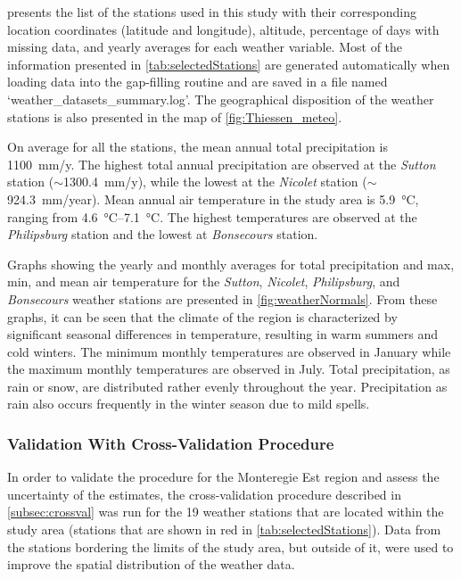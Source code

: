 \documentclass[TechnicalNoteMeteo.tex]{subfiles}
\begin{document}
 presents the list of the stations used in this study with their corresponding location coordinates (latitude and longitude), altitude, percentage of days with missing data, and yearly averages for each weather variable. Most of the information presented in \cref{tab:selectedStations} are generated automatically when loading data into the gap-filling routine and are saved in a file named `weather\_datasets\_summary.log'. The geographical disposition of the weather stations is also presented in the map of \cref{fig:Thiessen_meteo}.

On average for all the stations, the mean annual total precipitation is \SI{1100}{mm/y}. The highest total annual precipitation are observed at the \emph{Sutton} station ($\sim$\SI{1300.4}{mm/y}), while the lowest at the \emph{Nicolet} station ($\sim$\SI{924.3}{mm/year}). Mean annual air temperature in the study area is \SI{5.9}{\celsius}, ranging from \SIrange{4.6}{7.1}{\celsius}. The highest temperatures are observed at the \emph{Philipsburg} station and the lowest at \emph{Bonsecours} station.

Graphs showing the yearly and monthly averages for total precipitation and max, min, and mean air temperature for the \emph{Sutton}, \emph{Nicolet}, \emph{Philipsburg}, and \emph{Bonsecours} weather stations are presented in \cref{fig:weatherNormals}. From these graphs, it can be seen that the climate of the region is characterized by significant seasonal differences in temperature, resulting in warm summers and cold winters. The minimum monthly temperatures are observed in January while the maximum monthly temperatures are observed in July. Total precipitation, as rain or snow, are distributed rather evenly throughout the year. Precipitation as rain also occurs frequently in the winter season due to mild spells.

\subsubsection{Validation With Cross-Validation Procedure}

In order to validate the procedure for the Monteregie Est region and assess the uncertainty of the estimates, the cross-validation procedure described in \cref{subsec:crossval} was run for the 19 weather stations that are located within the study area (stations that are shown in red in \cref{tab:selectedStations}). Data from the stations bordering the limits of the study area, but outside of it, were used to improve the spatial distribution of the weather data. 
\end{document}
